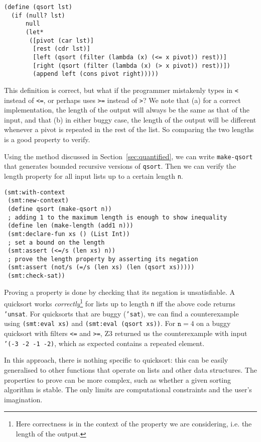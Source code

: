 \begin{verbatim}
(define (qsort lst)
  (if (null? lst)
      null
      (let*
       ([pivot (car lst)]
        [rest (cdr lst)]
        [left (qsort (filter (lambda (x) (<= x pivot)) rest))]
        [right (qsort (filter (lambda (x) (> x pivot)) rest))])
        (append left (cons pivot right)))))
\end{verbatim}

This definition is correct, but what if the programmer mistakenly types in
\texttt{<} instead of \texttt{<=}, or perhaps uses \texttt{>=} instead of
\texttt{>}? We note that (a) for a correct implementation, the length of the
output will always be the same as that of the input, and that (b) in either
buggy case, the length of the output will be different whenever a pivot is
repeated in the rest of the list. So comparing the two lengths is a good
property to verify.

Using the method discussed in Section~\ref{sec:quantified}, we can write
\texttt{make-qsort} that generates bounded recursive versions of
\texttt{qsort}. Then we can verify the length property for all input lists up
to a certain length \texttt{n}.

\begin{verbatim}
(smt:with-context
 (smt:new-context)
 (define qsort (make-qsort n))
 ; adding 1 to the maximum length is enough to show inequality
 (define len (make-length (add1 n)))
 (smt:declare-fun xs () (List Int))
 ; set a bound on the length
 (smt:assert (<=/s (len xs) n))
 ; prove the length property by asserting its negation
 (smt:assert (not/s (=/s (len xs) (len (qsort xs)))))
 (smt:check-sat))
\end{verbatim}

Proving a property is done by checking that its negation is unsatisfiable. A
quicksort works \textit{correctly}\footnote{Here correctness is in the context
of the property we are considering, i.e. the length of the output.} for lists
up to length \texttt{n} iff the above code returns \texttt{'unsat}. For
quicksorts that are buggy (\texttt{'sat}), we can find a counterexample using
\texttt{(smt:eval xs)} and \texttt{(smt:eval (qsort xs))}. For $\mathtt{n}=4$
on a buggy quicksort with filters \texttt{<=} and \texttt{>=}, Z3 returned us
the counterexample with input \texttt{'(-3 -2 -1 -2)}, which as expected
contains a repeated element.

In this approach, there is nothing specific to quicksort: this can be easily
generalised to other functions that operate on lists and other data
structures. The properties to prove can be more complex, such as whether a
given sorting algorithm is stable. The only limits are computational
constraints and the user's imagination.
